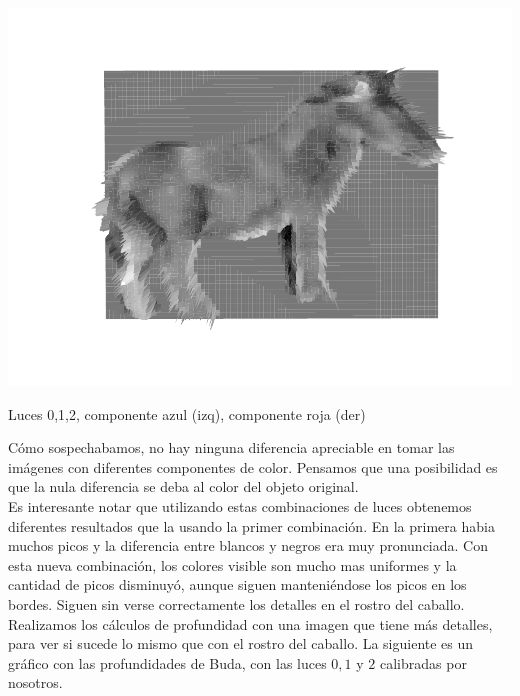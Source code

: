 {    %
    \includegraphics[scale=0.54]{informe/imagenes/profundidades/profCaballo012ColorRojo.pdf}
}
\begin{center}
    Luces 0,1,2, componente azul (izq), componente roja (der)
\end{center}

Cómo sospechabamos, no hay ninguna diferencia apreciable en tomar las imágenes con diferentes componentes de color. Pensamos que una posibilidad es que la nula diferencia se deba al color del objeto original. \\

Es interesante notar que utilizando estas combinaciones de luces obtenemos diferentes resultados que la usando la primer combinación. En la primera habia muchos picos y la diferencia entre blancos y negros era muy pronunciada. Con esta nueva combinación, los colores visible son mucho mas uniformes y la cantidad de picos disminuyó, aunque siguen manteniéndose los picos en los bordes. Siguen sin verse correctamente los detalles en el rostro del caballo. \\

Realizamos los cálculos de profundidad con una imagen que tiene más detalles, para ver si sucede lo mismo que con el rostro del caballo. La siguiente es un gráfico con las profundidades de Buda, con las luces $0, 1$ y $2$ calibradas por nosotros.

